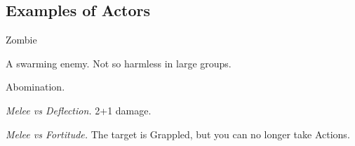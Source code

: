 \newpage
\subsection{Examples of Actors}


\begin{monsterboxbg}{Zombie}

    A swarming enemy. Not so harmless in large groups.
    
    \rpghline
    \stats[
        STR = \stat{12}, 
        DEX = \stat{12},
        CON = \stat{8},
        INT = \stat{6},
        WIS = \stat{8},
        CHA = \stat{10},
    ]
    \rpghline

    \basics[
    armorclass = 0,
    hitpoints  = 12,
    focus      = 1,
    defenses   = {Deflection 1, Reflex 1, Fortitude 0, Will -2}
    ]
    \rpghline

    \details[%
    accuracies = {Melee 2, Ranged -2},
    challenge = Weak,
    ]
    \rpghline%
    \begin{rpg-monsteraction}
        Abomination.
    \end{rpg-monsteraction}

    

    \begin{rpg-monsteraction}
        \textit{Melee vs Deflection.} 2+1 damage.
    \end{rpg-monsteraction}

    \begin{rpg-monsteraction}[Ensnare]
        \textit{Melee vs Fortitude.} The target is Grappled, but you can no longer take Actions.
    \end{rpg-monsteraction}


\end{monsterboxbg}



